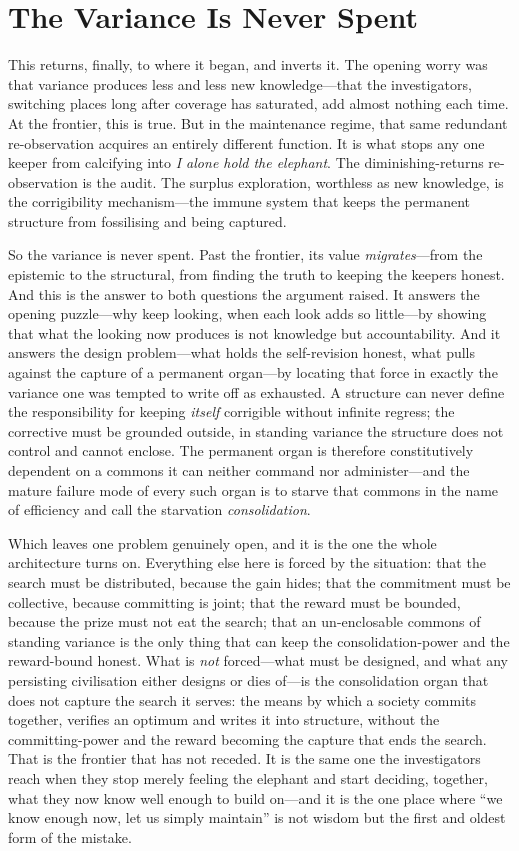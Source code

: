 \documentclass{article}
\begin{document}
\section*{The Variance Is Never Spent}

This returns, finally, to where it began, and inverts it. The opening worry was that variance produces less and less new knowledge---that the investigators, switching places long after coverage has saturated, add almost nothing each time. At the frontier, this is true. But in the maintenance regime, that same redundant re-observation acquires an entirely different function. It is what stops any one keeper from calcifying into \textit{I alone hold the elephant}. The diminishing-returns re-observation is the audit. The surplus exploration, worthless as new knowledge, is the corrigibility mechanism---the immune system that keeps the permanent structure from fossilising and being captured.

So the variance is never spent. Past the frontier, its value \textit{migrates}---from the epistemic to the structural, from finding the truth to keeping the keepers honest. And this is the answer to both questions the argument raised. It answers the opening puzzle---why keep looking, when each look adds so little---by showing that what the looking now produces is not knowledge but accountability. And it answers the design problem---what holds the self-revision honest, what pulls against the capture of a permanent organ---by locating that force in exactly the variance one was tempted to write off as exhausted. A structure can never define the responsibility for keeping \textit{itself} corrigible without infinite regress; the corrective must be grounded outside, in standing variance the structure does not control and cannot enclose. The permanent organ is therefore constitutively dependent on a commons it can neither command nor administer---and the mature failure mode of every such organ is to starve that commons in the name of efficiency and call the starvation \textit{consolidation}.

Which leaves one problem genuinely open, and it is the one the whole architecture turns on. Everything else here is forced by the situation: that the search must be distributed, because the gain hides; that the commitment must be collective, because committing is joint; that the reward must be bounded, because the prize must not eat the search; that an un-enclosable commons of standing variance is the only thing that can keep the consolidation-power and the reward-bound honest. What is \textit{not} forced---what must be designed, and what any persisting civilisation either designs or dies of---is the consolidation organ that does not capture the search it serves: the means by which a society commits together, verifies an optimum and writes it into structure, without the committing-power and the reward becoming the capture that ends the search. That is the frontier that has not receded. It is the same one the investigators reach when they stop merely feeling the elephant and start deciding, together, what they now know well enough to build on---and it is the one place where ``we know enough now, let us simply maintain'' is not wisdom but the first and oldest form of the mistake.
\end{document}
